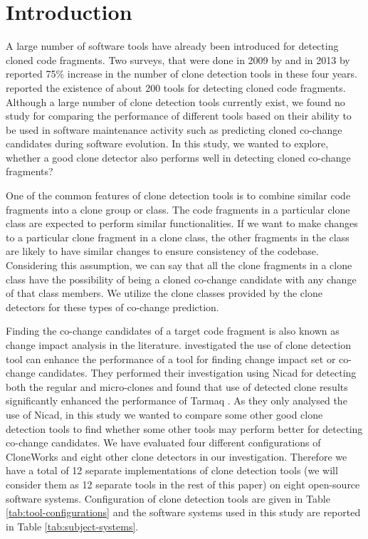 \documentclass[review]{elsarticle}
\begin{document}
\linenumbers

\section{Introduction}
\label{the-introduction}
A large number of software tools have already been introduced for detecting cloned code fragments. Two surveys, that were done in 2009 by \citet{Roy09comparisonand} and in 2013 by \citet{journals/infsof/RattanBS13} reported 75\% increase in the number of clone detection tools in these four years. \citet{BigCloneBenchCKRoyJRCordy} reported the existence of about 200 tools for detecting cloned code fragments. Although a large number of clone detection tools currently exist, we found no study for comparing the performance of different tools based on their ability to be used in software maintenance activity such as predicting cloned co-change candidates during software evolution. In this study, we wanted to explore, whether a good clone detector also performs well in detecting cloned co-change fragments? %

One of the common features of clone detection tools is to combine similar code fragments into a clone group or class. The code fragments in a particular clone class are expected to perform similar functionalities. If we want to make changes to a particular clone fragment in a clone class, the other fragments in the class are likely to have similar changes to ensure consistency of the codebase. Considering this assumption, we can say that all the clone fragments in a clone class have the possibility of being a cloned co-change candidate with any change of that class members. We utilize the clone classes provided by the clone detectors for these types of co-change prediction.

Finding the co-change candidates of a target code fragment is also known as change impact analysis \cite{book-change-impact} in the literature.  \citet{Mondal:Association:Rules} investigated the use of clone detection tool can enhance the performance of a tool for finding change impact set or co-change candidates. They performed their investigation using Nicad for detecting both the regular and micro-clones and found that use of detected clone results significantly enhanced the performance of Tarmaq \citet{TarmaqChangeImpact}. As they only analysed the use of Nicad, in this study we wanted to compare some other good clone detection tools to find whether some other tools may perform better for detecting co-change candidates. We have evaluated four different configurations of CloneWorks \citet{CloneWorks-Jeff} and eight other clone detectors in our investigation. Therefore we have a total of 12 separate implementations of clone detection tools (we will consider them as 12 separate tools in the rest of this paper) on eight open-source software systems. Configuration of clone detection tools are given in Table \ref{tab:tool-configurations} and the software systems used in this study are reported in Table \ref{tab:subject-systems}.
\end{document}
